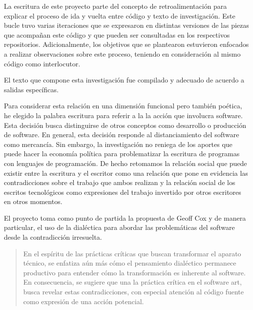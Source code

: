 
La escritura de este proyecto parte del concepto de retroalimentación para explicar el proceso de ida y vuelta entre código y texto de investigación. Este bucle tuvo varias iteraciones que se expresaron en distintas versiones de las piezas que acompañan este código y que pueden ser consultadas en los respectivos repositorios. Adicionalmente, los objetivos que se plantearon estuvieron enfocados a realizar observaciones sobre este proceso, teniendo en consideración al mismo código como interlocutor. 

El texto que compone esta investigación fue compilado y adecuado de acuerdo a salidas específicas. %


Para considerar esta relación en una dimensión funcional pero también poética, he elegido la palabra escritura para referir a la la acción que involucra software. Esta decisión busca distinguirse de otros conceptos como desarrollo o producción de software. En general, esta decisión responde al distanciamiento del software como mercancía. Sin embargo, la investigación no reniega de los aportes que puede hacer la economía política para problematizar la escritura de programas con lenguajes de programación. De hecho retomamos la relación social que puede existir entre la escritura y el escritor como una relación que pone en evidencia las contradicciones sobre el trabajo que ambos realizan y la relación social de los escritos tecnológicos como expresiones del trabajo invertido por otros escritores en otros momentos. 


El proyecto toma como punto de partida la propuesta de Geoff Cox y de manera particular, el uso de la dialéctica para abordar las problemáticas del software desde la contradicción irresuelta.

\begin{quote}
  En el espíritu de las prácticas críticas que buscan transformar el aparato técnico, se enfatiza aún más cómo el pensamiento dialéctico permanece productivo para entender cómo la transformación es inherente al software. En consecuencia, se sugiere que una la práctica crítica en el software art, busca revelar estas contradicciones, con especial atención al código fuente como expresión de una acción potencial.\citep[p.14]{antithesis}
\end{quote}

